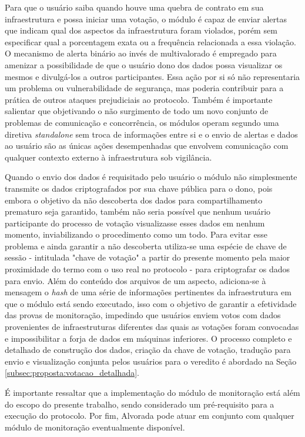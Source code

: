 Para que o usuário saiba quando houve uma quebra de contrato em sua infraestrutura e possa iniciar uma votação, o módulo é capaz de enviar alertas que indicam qual dos aspectos da infraestrutura foram violados, porém sem especificar qual a porcentagem exata ou a frequência relacionada a essa violação. O mecanismo de alerta binário ao invés de multivalorado é empregado para amenizar a possibilidade de que o usuário dono dos dados possa visualizar os mesmos e divulgá-los a outros participantes. Essa ação por si só não representaria um problema ou vulnerabilidade de segurança, mas poderia contribuir para a prática de outros ataques prejudiciais ao protocolo. Também é importante salientar que objetivando o não surgimento de todo um novo conjunto de problemas de comunicação e concorrência, os módulos operam segundo uma diretiva \textit{standalone} sem troca de informações entre si e o envio de alertas e dados ao usuário são as únicas ações desempenhadas que envolvem comunicação com qualquer contexto externo à infraestrutura sob vigilância. 

%
Quando o envio dos dados é requisitado pelo usuário o módulo não simplesmente transmite os dados criptografados por sua chave pública para o dono, pois embora o objetivo da não descoberta dos dados para compartilhamento prematuro seja garantido, também não seria possível que nenhum usuário participante do processo de votação visualizasse esses dados em nenhum momento, inviabilizando o procedimento como um todo. Para evitar esse problema e ainda garantir a não descoberta utiliza-se uma espécie de chave de sessão - intitulada "chave de votação" a partir do presente momento pela maior proximidade do termo com o uso real no protocolo - para criptografar os dados para envio. Além do conteúdo dos arquivos de um aspecto, adiciona-se à mensagem o \textit{hash} de uma série de informações pertinentes da infraestrutura em que o módulo está sendo executado, isso com o objetivo de garantir a efetividade das provas de monitoração, impedindo que usuários enviem votos com dados provenientes de infraestruturas diferentes das quais as votações foram convocadas e impossibilitar a forja de dados em máquinas inferiores. O processo completo e detalhado de construção dos dados, criação da chave de votação, tradução para envio e visualização conjunta pelos usuários para o veredito é abordado na Seção \ref{subsec:proposta:votacao_detalhada}.

É importante ressaltar que a implementação do módulo de monitoração está além do escopo do presente trabalho, sendo considerado um pré-requisito para a execução do protocolo.
Por fim, Alvorada pode atuar em conjunto com qualquer módulo de monitoração eventualmente disponível.

